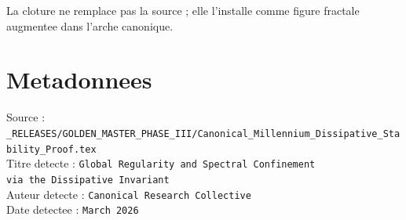 ﻿\documentclass[11pt,a4paper]{article}
\begin{document}
La cloture ne remplace pas la source ; elle l'installe comme figure fractale augmentee dans l'arche canonique.



\section*{Metadonnees}

Source : \verb|_RELEASES/GOLDEN_MASTER_PHASE_III/Canonical_Millennium_Dissipative_Stability_Proof.tex|\\

Titre detecte : \texttt{Global Regularity and Spectral Confinement\\ via the Dissipative Invariant}\\

Auteur detecte : \texttt{Canonical Research Collective}\\

Date detectee : \texttt{March 2026}
\end{document}
